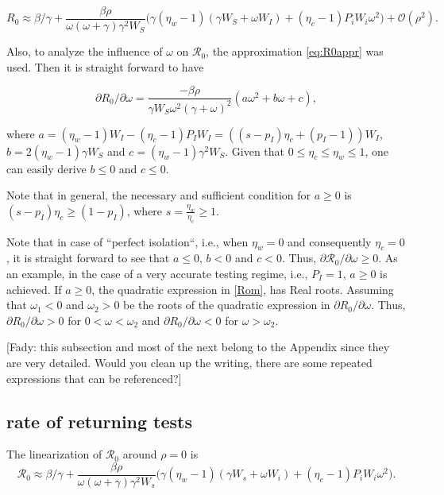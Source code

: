 \documentclass[12pt]{article}
\newcommand{\Rnum}{\mathcal{R}_0}
\theoremstyle{definition} %
\begin{document}
\begin{equation}
\label{eq:R0appr}
R_0 \approx \beta/\gamma + \frac{\beta \rho}{\omega (\omega+\gamma) \gamma^2 W_S} \Big(\gamma(\eta_w-1)(\gamma W_S+\omega W_I) + (\eta_c -1)P_iW_i \omega^2 \Big) + \mathcal{O}(\rho^2).
\end{equation}

Also, to analyze the influence of $\omega$ on $\Rnum$, the approximation \eqref{eq:R0appr} was used. Then it is straight forward to have

\begin{equation}
\label{Rom}
\partial{R_0}/\partial{\omega}=  \frac{-\beta \rho}{\gamma W_S\omega^2 (\gamma+\omega)^2}  (a \omega^2 + b \omega + c),
\end{equation}

where $a=(\eta_w-1)W_I-(\eta_c-1)P_I W_I = ((s-p_I)\eta_c + (p_I-1)) W_I$, $b=2(\eta_w-1)\gamma W_S$ and $c=(\eta_w-1)\gamma^2 W_S$.
Given that $0 \leq \eta_c\leq \eta_w \leq 1 $, one can easily derive $b\leq 0$ and $c \leq 0$. 

Note that in general, the necessary and sufficient condition for $a \geq 0$ is $(s-p_I) \eta_c \geq (1-p_I)$, where $s=\frac{\eta_w}{\eta_c} \geq 1$. 

Note that in case of ``perfect isolation``, i.e., when $\eta_w=0$ and consequently $\eta_c=0$, it is straight forward to see that $a \leq 0$, $b<0$ and $c<0$. Thus, $\partial{\Rnum}/\partial{\omega} \geq 0$. 
As an example, in the case of a very accurate testing regime,  i.e., $P_I=1$, $a \geq 0$ is achieved. If $a\geq 0$, the quadratic expression in \eqref{Rom}, has Real roots. Assuming that $\omega_1<0$ and $\omega_2>0$ be the roots of the quadratic expression in $\partial{R_0}/\partial{\omega}$. Thus, $\partial{R_0}/\partial{\omega}>0$ for $0<\omega<\omega_2$ and  $\partial{R_0}/\partial{\omega}<0$ for $\omega>\omega_2$.

[Fady: this subsection and most of the next belong to the Appendix since they are very detailed. Would you clean up the writing, there are some repeated expressions that can be referenced?]

\subsection{rate of returning tests}
The linearization of $\Rnum$ around $\rho=0$ is
\begin{equation}\label{linearization}
\Rnum \approx \beta/\gamma + \frac{\beta \rho}{\omega (\omega+\gamma) \gamma^2 W_s} \Big(\gamma(\eta_w-1)(\gamma W_s+\omega W_i) + (\eta_c -1)P_iW_i \omega^2 \Big). 
\end{equation}
\end{document}

